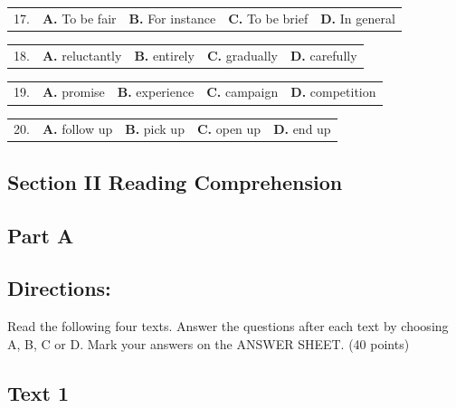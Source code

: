 \documentclass[UTF8,11pt]{ctexart}
\begin{document}
\noindent\begin{tabularx}{\linewidth}{@{}lXXXX@{}}17. & \textbf{A.} To be fair & \textbf{B.} For instance & \textbf{C.} To be brief & \textbf{D.} In general\\\end{tabularx}\par

\noindent\begin{tabularx}{\linewidth}{@{}lXXXX@{}}18. & \textbf{A.} reluctantly & \textbf{B.} entirely & \textbf{C.} gradually & \textbf{D.} carefully\\\end{tabularx}\par

\noindent\begin{tabularx}{\linewidth}{@{}lXXXX@{}}19. & \textbf{A.} promise & \textbf{B.} experience & \textbf{C.} campaign & \textbf{D.} competition\\\end{tabularx}\par

\noindent\begin{tabularx}{\linewidth}{@{}lXXXX@{}}20. & \textbf{A.} follow up & \textbf{B.} pick up & \textbf{C.} open up & \textbf{D.} end up\\\end{tabularx}\par

\subsection*{\textbf{Section II Reading Comprehension}}


\subsection*{\textbf{Part A}}


\subsection*{\textbf{Directions:}}


Read the following four texts. Answer the questions after each text by choosing A, B, C or D. Mark your answers on the ANSWER SHEET. (40 points)


\subsection*{\textbf{Text 1}}
\end{document}

